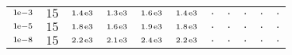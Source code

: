 \begin{tiny}
\begin{tabular}{@{$\;$}c@{$\;$}|@{$\;$}c@{$\;$}@{$\;$}c@{$\;$}@{$\;$}c@{$\;$}@{$\;$}c@{$\;$}@{$\;$}c@{$\;$}|@{$\;$}c@{$\;$}@{$\;$}c@{$\;$}@{$\;$}c@{$\;$}@{$\;$}c@{$\;$}@{$\;$}c@{$\;$}}
$\scriptstyle1\!\mathrm{\hspace{0.10em}e}-3$ & $\scriptstyle15$ & $\scriptstyle1.4\mathrm{\hspace{0.10em}e}3$ & $\scriptstyle1.3\mathrm{\hspace{0.10em}e}3$ & $\scriptstyle1.6\mathrm{\hspace{0.10em}e}3$ & $\scriptstyle1.4\mathrm{\hspace{0.10em}e}3$ & $\scriptstyle.$ & $\scriptstyle.$ & $\scriptstyle.$ & $\scriptstyle.$ & $\scriptstyle.$\\ 
$\scriptstyle1\!\mathrm{\hspace{0.10em}e}-5$ & $\scriptstyle15$ & $\scriptstyle1.8\mathrm{\hspace{0.10em}e}3$ & $\scriptstyle1.6\mathrm{\hspace{0.10em}e}3$ & $\scriptstyle1.9\mathrm{\hspace{0.10em}e}3$ & $\scriptstyle1.8\mathrm{\hspace{0.10em}e}3$ & $\scriptstyle.$ & $\scriptstyle.$ & $\scriptstyle.$ & $\scriptstyle.$ & $\scriptstyle.$\\ 
$\scriptstyle1\!\mathrm{\hspace{0.10em}e}-8$ & $\scriptstyle15$ & $\scriptstyle2.2\mathrm{\hspace{0.10em}e}3$ & $\scriptstyle2.1\mathrm{\hspace{0.10em}e}3$ & $\scriptstyle2.4\mathrm{\hspace{0.10em}e}3$ & $\scriptstyle2.2\mathrm{\hspace{0.10em}e}3$ & $\scriptstyle.$ & $\scriptstyle.$ & $\scriptstyle.$ & $\scriptstyle.$ & $\scriptstyle.$\\ 
\end{tabular} 
\end{tiny} 
